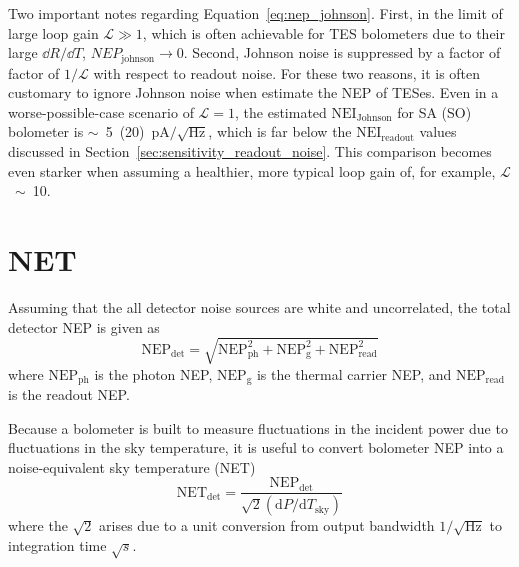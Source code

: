 Two important notes regarding Equation~\ref{eq:nep_johnson}. First, in the limit of large loop gain $\mathcal{L} \gg 1$, which is often achievable for TES bolometers due to their large $\dd R / \dd T$, $NEP_{\mathrm{johnson}} \rightarrow 0$. Second, Johnson noise is suppressed by a factor of factor of $1 / \mathcal{L}$ with respect to readout noise. For these two reasons, it is often customary to ignore Johnson noise when estimate the NEP of TESes. Even in a worse-possible-case scenario of $\mathcal{L} = 1$, the estimated $\mathrm{NEI_{Johnson}}$ for SA (SO) bolometer is $\sim$~5~(20)~$\mathrm{pA / \sqrt{Hz}}$, which is far below the $\mathrm{NEI_{readout}}$ values discussed in Section~\ref{sec:sensitivity_readout_noise}. This comparison becomes even starker when assuming a healthier, more typical loop gain of, for example, $\mathcal{L}$~$\sim$~10.


\section{NET}
\label{sec:sensitivity_calculation_net}

Assuming that the all detector noise sources are white and uncorrelated, the total detector NEP is given as
\begin{equation}
    \mathrm{NEP}_{\mathrm{det}} = \sqrt{\mathrm{NEP}_{\mathrm{ph}}^{2} + \mathrm{NEP}_{\mathrm{g}}^{2} + \mathrm{NEP}_{\mathrm{read}}^{2}}
    \label{eq:nep_det}
\end{equation}
where $\mathrm{NEP}_{\mathrm{ph}}$ is the photon NEP, $\mathrm{NEP}_{\mathrm{g}}$ is the thermal carrier NEP, and $\mathrm{NEP}_{\mathrm{read}}$ is the readout NEP.

Because a bolometer is built to measure fluctuations in the incident power due to fluctuations in the sky temperature, it is useful to convert bolometer NEP into a noise-equivalent sky temperature (NET) 
\begin{equation}
    \mathrm{NET}_{\mathrm{det}} = \frac{\mathrm{NEP}_{\mathrm{det}}}{\sqrt{2} \left( \mathrm{d} P / \mathrm{d} T_{\mathrm{sky}} \right)}
    \label{eq:net}
\end{equation}
where the $\sqrt{2}$ arises due to a unit conversion from output bandwidth $1 / \sqrt{\mathrm{Hz}}$ to integration time $\sqrt{s}$.

